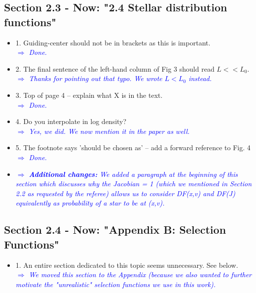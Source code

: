 \documentclass[10pt,a4paper]{article}
\newcommand{\Comment}[1]{\textsl{\textcolor{Blue}{$\Longrightarrow$ {#1}}}}
\begin{document}
\subsection{Section 2.3 - Now: "2.4 Stellar distribution functions"}
\begin{itemize}
\item 1. Guiding-center should not be in brackets as this is important. \\\Comment{Done.}
\item 2. The final sentence of the left-hand column of Fig 3 should read $L<<L_0$. \\\Comment{Thanks for pointing out that typo. We wrote $L < L_0$ instead.}
\item 3. Top of page 4 -- explain what X is in the text. \\\Comment{Done.}
\item 4. Do you interpolate in log density? \\\Comment{Yes, we did. We now mention it in the paper as well.}
\item 5. The footnote says 'should be chosen as' -- add a forward reference to Fig. 4 \\\Comment{Done.}
\item \Comment{\textbf{Additional changes:} We added a paragraph at the beginning of this section which discusses why the Jacobian = 1 (which we mentioned in Section 2.2 as requested by the referee) allows us to consider DF(x,v) and DF(J) equivalently as probability of a star to be at (x,v).}
\end{itemize}

\subsection{Section 2.4 - Now: "Appendix B: Selection Functions"}
\begin{itemize}
\item 1. An entire section dedicated to this topic seems unnecessary. See below. \\\Comment{We moved this section to the Appendix (because we also wanted to further motivate the "unrealistic" selection functions we use in this work).}
\end{itemize}
\end{document}

